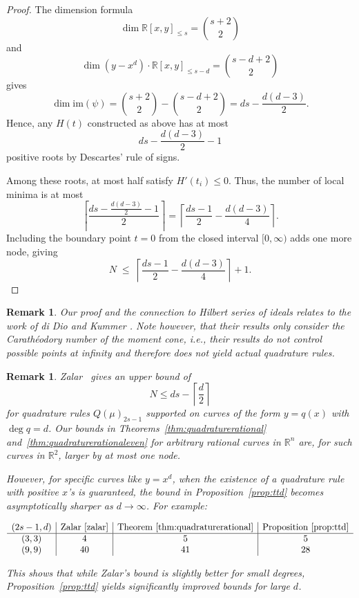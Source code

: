 \documentclass[11pt,a4paper]{amsart}
\numberwithin{equation}{section}
\newtheorem{remark}[thm]{Remark}
\theoremstyle{definition}
\newcommand{\R}{\mathbb{R}}
\numberwithin{thm}{section}
\theoremstyle{break}
\numberwithin{subcase}{case}
\begin{document}
\begin{proof}
The dimension formula
\[
\dim \R[x,y]_{\le s} = {s+2\choose 2}
\]
and
\[
\dim (y-x^d)\cdot \R[x,y]_{\le s-d} = {s-d+2\choose 2}
\]
gives
\[
\dim \mathrm{im}(\psi)
= {s+2\choose 2}-{s-d+2\choose 2}
= ds - \frac{d(d-3)}{2}.
\]
Hence, any $H(t)$ constructed as above has at most  
\[
ds - \frac{d(d-3)}{2} - 1
\]
positive roots by Descartes' rule of signs.
       
Among these roots, at most half satisfy $H'(t_i)\le 0$.  
Thus, the number of local minima is at most
\[
\left\lceil \frac{ds - \frac{d(d-3)}{2} - 1}{2}\right\rceil
= \left\lceil \frac{ds-1}{2}-\frac{d(d-3)}{4}\right\rceil.
\]
Including the boundary point $t=0$ from the closed interval $[0,\infty)$ adds one more node, giving
\[
N \;\le\; \left\lceil \frac{ds-1}{2}-\frac{d(d-3)}{4} \right\rceil + 1.    \]
    


 \end{proof}
{
\begin{remark}
 Our proof and the connection to Hilbert series of ideals relates to the work of di Dio and Kummer \cite{diDioKummer2021}. Note however, that their results only consider the Carathéodory number of the moment cone, i.e., their results do not control possible points at {infinity} and therefore does not yield actual quadrature rules.     
\end{remark}
 }
\begin{remark}
Zalar~\cite{zalar} gives an upper bound of 
\[
N \leq d s - \left\lceil \frac{d}{2} \right\rceil
\]
for quadrature rules $Q(\mu)_{2s-1}$ supported on curves of the form $y = q(x)$ with $\deg q = d$. 
Our bounds in Theorems~\ref{thm:quadraturerational} and~\ref{thm:quadraturerationaleven} for arbitrary rational curves in $\R^n$ are, for such curves in $\R^2$, larger by at most one node. 

However, for specific curves like $y = x^d$, when the existence of a quadrature rule with positive $x$'s is guaranteed, the bound in Proposition~\ref{prop:ttd} becomes asymptotically sharper as $d \to \infty$. For example:
\begin{table}[h!]
$$
\begin{array}{c|c|c|c}
(2s-1,d) & \text{Zalar~\cite{zalar}} & \text{Theorem~\ref{thm:quadraturerational}} & \text{Proposition~\ref{prop:ttd}} \\ \hline
(3,3) & 4 & 5&  5 \\
(9,9) & 40 & 41& 28
\end{array}
$$
\caption{Upper bound on nodes for a quadrature rule of strength $2s-1$ on $y=x^d$.}
\end{table}

This shows that while Zalar's bound is slightly better for small degrees, Proposition~\ref{prop:ttd} yields significantly improved bounds for large $d$.
\end{remark}
\end{document}
